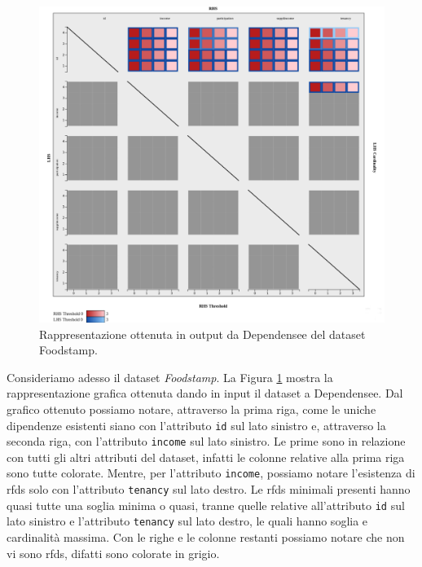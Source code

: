 \begin{figure}[ht]
    \centering
    \includegraphics[width=\linewidth]{capitoli/figure/foodstamp_result}
    \caption{Rappresentazione ottenuta in output da Dependensee del dataset Foodstamp.}
    \label{fig:foodstamp_result}
\end{figure}
Consideriamo adesso il dataset \textit{Foodstamp}. La Figura \ref{fig:foodstamp_result} mostra la rappresentazione grafica ottenuta dando in input il dataset a Dependensee. Dal grafico ottenuto possiamo notare, attraverso la prima riga, come le uniche dipendenze esistenti siano con l'attributo \texttt{id} sul lato sinistro e, attraverso la seconda riga, con l'attributo \texttt{income} sul lato sinistro. Le prime sono in relazione con tutti gli altri attributi del dataset, infatti le colonne relative alla prima riga sono tutte colorate. Mentre, per l'attributo \texttt{income}, possiamo notare l'esistenza di \acrlong{rfds} solo con l'attributo \texttt{tenancy} sul lato destro. Le \acrlong{rfds} minimali presenti hanno quasi tutte una soglia minima o quasi, tranne quelle relative all'attributo \texttt{id} sul lato sinistro e l'attributo \texttt{tenancy} sul lato destro, le quali hanno soglia e cardinalit\`{a} massima. Con le righe e le colonne restanti possiamo notare che non vi sono \acrlong{rfds}, difatti sono colorate in grigio.\par
